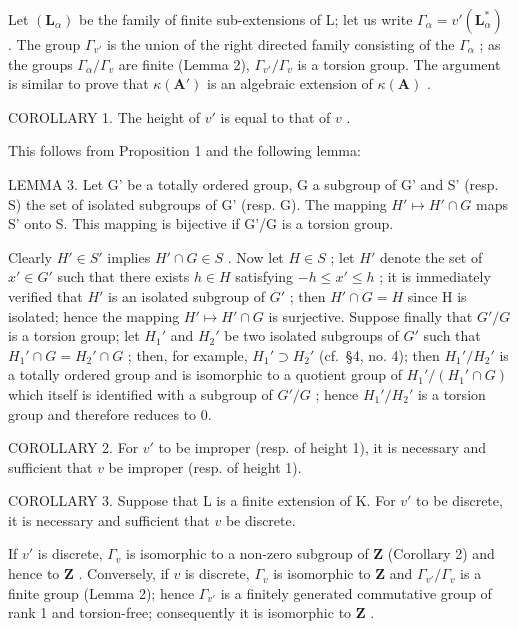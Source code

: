Let \((\mathbf{L}_{\alpha})\) be the family of finite sub-extensions of L; let us write \(\Gamma_{\alpha} = v'(\mathbf{L}_{\alpha}^{*})\) . The group \(\Gamma_{v'}\) is the union of the right directed family consisting of the \(\Gamma_{\alpha}\) ; as the groups \(\Gamma_{\alpha}/\Gamma_{v}\) are finite (Lemma 2), \(\Gamma_{v'}/\Gamma_{v}\) is a torsion group. The argument is similar to prove that \(\kappa(\mathbf{A}')\) is an algebraic extension of \(\kappa(\mathbf{A})\) .

COROLLARY 1. The height of \(v'\) is equal to that of \(v\) .

This follows from Proposition 1 and the following lemma:

LEMMA 3. Let G' be a totally ordered group, G a subgroup of G' and S' (resp. S) the set of isolated subgroups of G' (resp. G). The mapping \(H' \mapsto H' \cap G\) maps S' onto S. This mapping is bijective if G'/G is a torsion group.

Clearly \(H' \in S'\) implies \(H' \cap G \in S\) . Now let \(H \in S\) ; let \(H'\) denote the set of \(x' \in G'\) such that there exists \(h \in H\) satisfying \(-h \leqslant x' \leqslant h\) ; it is immediately verified that \(H'\) is an isolated subgroup of \(G'\) ; then \(H' \cap G = H\) since H is isolated; hence the mapping \(H' \mapsto H' \cap G\) is surjective. Suppose finally that \(G'/G\) is a torsion group; let \(H_1'\) and \(H_2'\) be two isolated subgroups of \(G'\) such that \(H_1' \cap G = H_2' \cap G\) ; then, for example, \(H_1' \supset H_2'\) (cf.~§4, no. 4); then \(H_1'/H_2'\) is a totally ordered group and is isomorphic to a quotient group of \(H_1'/(H_1' \cap G)\) which itself is identified with a subgroup of \(G'/G\) ; hence \(H_1'/H_2'\) is a torsion group and therefore reduces to 0.

COROLLARY 2. For \(v'\) to be improper (resp. of height 1), it is necessary and sufficient that \(v\) be improper (resp. of height 1).

COROLLARY 3. Suppose that L is a finite extension of K. For \(v'\) to be discrete, it is necessary and sufficient that \(v\) be discrete.

If \(v'\) is discrete, \(\Gamma_v\) is isomorphic to a non-zero subgroup of \(\mathbf{Z}\) (Corollary 2) and hence to \(\mathbf{Z}\) . Conversely, if \(v\) is discrete, \(\Gamma_v\) is isomorphic to \(\mathbf{Z}\) and \(\Gamma_{v'} / \Gamma_v\) is a finite group (Lemma 2); hence \(\Gamma_{v'}\) is a finitely generated commutative group of rank 1 and torsion-free; consequently it is isomorphic to \(\mathbf{Z}\) .

